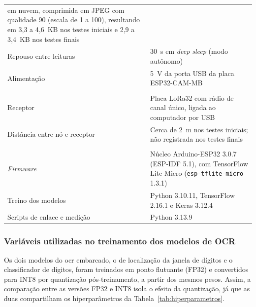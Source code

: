 \begin{table}[H]
\begin{tabularx}{\textwidth}{@{}lX@{}}
            em nuvem, comprimida em JPEG com qualidade 90 (escala de 1 a 100), resultando em
            3,3 a 4,6~KB nos testes iniciais e 2,9 a 3,4~KB nos testes finais \\
        Repouso entre leituras & 30~s em \textit{deep sleep} (modo autônomo) \\
        Alimentação & 5~V da porta USB da placa ESP32-CAM-MB \\
        \addlinespace
        \multicolumn{2}{@{}l}{\textit{Cenário de bancada}} \\
        Receptor & Placa LoRa32 com rádio de canal único, ligada ao computador por USB \\
        Distância entre nó e receptor & Cerca de 2~m nos testes iniciais; não registrada nos testes finais \\
        \addlinespace
        \multicolumn{2}{@{}l}{\textit{Software}} \\
        \textit{Firmware} & Núcleo Arduino-ESP32 3.0.7 (ESP-IDF 5.1), com TensorFlow Lite
            Micro (\texttt{esp-tflite-micro} 1.3.1) \\
        Treino dos modelos & Python 3.10.11, TensorFlow 2.16.1 e Keras 3.12.4 \\
        Scripts de enlace e medição & Python 3.13.9 \\
        \bottomrule
    \end{tabularx}
\end{table}

\subsubsection{Variáveis utilizadas no treinamento dos modelos de OCR}

Os dois modelos do \gls{ocr} embarcado, o de localização da janela de dígitos e o
classificador de dígitos, foram treinados em ponto flutuante (FP32) e convertidos para INT8
por quantização pós-treinamento, a partir dos mesmos pesos. Assim, a comparação entre as
versões FP32 e INT8 isola o efeito da quantização, já que as duas compartilham os
hiperparâmetros da Tabela~\ref{tab:hiperparametros}.

